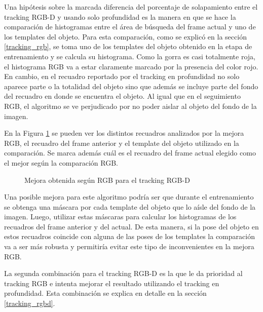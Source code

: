 Una hipótesis sobre la marcada diferencia del porcentaje de solapamiento entre el tracking RGB-D y usando solo profundidad es la manera en que se hace la comparación de histogramas entre el área de búsqueda del frame actual y uno de los templates del objeto. Para esta comparación, como se explicó en la sección \ref{tracking_rgb}, se toma uno de los templates del objeto obtenido en la etapa de entrenamiento y se calcula su histograma. Como la gorra es casi totalmente roja, el histograma RGB va a estar claramente marcado por la presencia del color rojo. En cambio, en el recuadro reportado por el tracking en profundidad no solo aparece parte o la totalidad del objeto sino que además se incluye parte del fondo del recuadro en donde se encuentra el objeto. Al igual que en el seguimiento RGB, el algoritmo se ve perjudicado por no poder aislar al objeto del fondo de la imagen.

En la Figura \ref{mejora_rgb_en_tracking_rgbd} se pueden ver los distintos recuadros analizados por la mejora RGB, el recuadro del frame anterior y el template del objeto utilizado en la comparación. Se marca además cuál es el recuadro del frame actual elegido como el mejor según la comparación RGB.

\begin{figure}
	\caption{Mejora obtenida según RGB para el tracking RGB-D}
	\label{mejora_rgb_en_tracking_rgbd}
\end{figure}

Una posible mejora para este algoritmo podría ser que durante el entrenamiento se obtenga una máscara por cada template del objeto que lo aísle del fondo de la imagen. Luego, utilizar estas máscaras para calcular los histogramas de los recuadros del frame anterior y del actual. De esta manera, si la pose del objeto en estos recuadros coincide con alguna de las poses de los templates la comparación va a ser más robusta y permitiría evitar este tipo de inconvenientes en la mejora RGB.

La segunda combinación para el tracking RGB-D es la que le da prioridad al tracking RGB e intenta mejorar el resultado utilizando el tracking en profundidad. Esta combinación se explica en detalle en la sección \ref{tracking_rgbd}.

